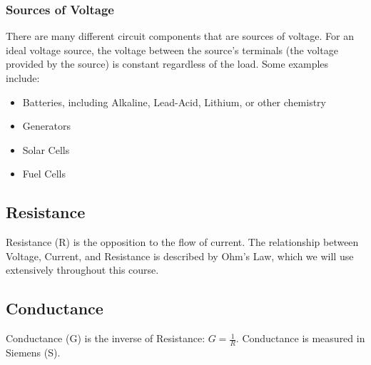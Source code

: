 \documentclass{article}
\begin{document}
\subsubsection{Sources of Voltage}
There are many different circuit components that are sources of voltage. For an ideal voltage source, the voltage between the source's terminals (the voltage provided by the source) is constant regardless of the load. Some examples include:
\begin{itemize}
\item Batteries, including Alkaline, Lead-Acid, Lithium, or other chemistry 
\item Generators
\item Solar Cells
\item Fuel Cells
\end{itemize}
\subsection{Resistance}
Resistance (R) is the opposition to the flow of current. The relationship between Voltage, Current, and Resistance is described by Ohm's Law, which we will use extensively throughout this course.
\subsection{Conductance}
Conductance (G) is the inverse of Resistance: $G = \frac{1}{R}$. Conductance is measured in Siemens (S).
\end{document}
